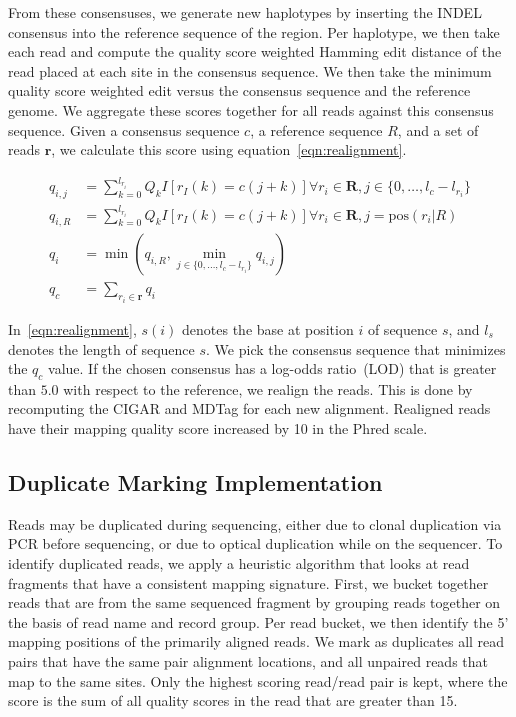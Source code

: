 \documentclass[masters]{ucbthesis}
\begin{document}
From these consensuses, we generate new haplotypes by inserting the INDEL consensus into the reference
sequence of the region. Per haplotype, we then take each read and compute the quality score weighted Hamming
edit distance of the read placed at each site in the consensus sequence. We then take the minimum quality
score weighted edit versus the consensus sequence and the reference genome. We aggregate these scores
together for all reads against this consensus sequence. Given a consensus sequence $c$, a reference sequence $R$,
and a set of reads $\mathbf{r}$, we calculate this score using equation~\eqref{eqn:realignment}.

\begin{align}
\label{eqn:realignment}
q_{i, j} &= \sum_{k = 0}^{l_{r_i}} Q_k I[r_I(k) = c(j + k)] \forall r_i \in \mathbf{R}, j \in \{0, \dots, l_c - l_{r_i}\}  \\
q_{i, R} &= \sum_{k = 0}^{l_{r_i}} Q_k I[r_I(k) = c(j + k)] \forall r_i \in \mathbf{R}, j = \text{pos}(r_i | R) \\
q_i &= \min(q_{i, R}, \min_{j \in \{0, \dots, l_c - l_{r_i}\}} q_{i, j}) \\
q_c &= \sum_{r_i \in \mathbf{r}} q_i
\end{align}

In~\eqref{eqn:realignment}, $s(i)$ denotes the base at position $i$ of sequence $s$, and $l_s$ denotes the
length of sequence $s$. We pick the consensus sequence that minimizes the $q_c$ value. If the chosen
consensus has a log-odds ratio~(LOD) that is greater than $5.0$ with respect to the reference, we realign the
reads. This is done by recomputing the CIGAR and MDTag for each new alignment. Realigned reads have their
mapping quality score increased by 10 in the Phred scale.

\subsection{Duplicate Marking Implementation}
\label{sec:duplicate-marking-implementation}

Reads may be duplicated during sequencing, either due to clonal duplication via PCR before sequencing, or
due to optical duplication while on the sequencer. To identify duplicated reads, we apply a heuristic algorithm
that looks at read fragments that have a consistent mapping signature. First, we bucket together reads that
are from the same sequenced fragment by grouping reads together on the basis of read name and record group.
Per read bucket, we then identify the 5' mapping positions of the primarily aligned reads.
We mark as duplicates all read pairs that have the same pair alignment locations, and all unpaired reads that
map to the same sites. Only the highest scoring read/read pair is kept, where the score is the sum of all quality
scores in the read that are greater than 15.
\end{document}
